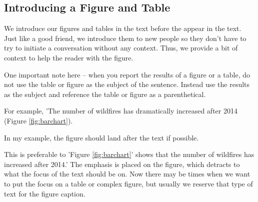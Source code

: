 \documentclass{article}\usepackage[]{graphicx}\usepackage[]{color}
\begin{document}
\subsection{Introducing a Figure and Table}

We introduce our figures and tables in the text before the appear in the text. Just like a good friend, we introduce them to new people so they don't have to try to initiate a conversation without any context. Thus, we provide a bit of context to help the reader with the figure. 

One important note here -- when you report the results of a figure or a table, do not use the table or figure as the subject of the sentence. Instead use the results as the subject and reference the table or figure as a parenthetical. 

For example, 'The number of wildfires has dramatically increased after 2014 (Figure \ref{fig:barchart}). 

In my example, the figure should land after the text if possible. 

This is preferable to 'Figure \ref{fig:barchart}' shows that the number of wildfires has increased after 2014.' The emphasis is placed on the figure, which detracts to what the focus of the text should be on. Now there may be times when we want to put the focus on a table or complex figure, but usually we reserve that type of text for the figure caption. 
\end{document}
